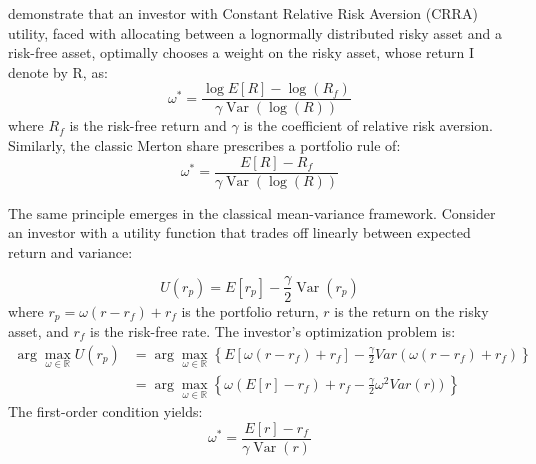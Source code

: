 \documentclass[12pt]{article}
\newcommand{\R}{\mathbb{R}}
\begin{document}
\citet{campbell2002strategic} demonstrate that an investor with Constant Relative Risk Aversion (CRRA) utility, faced with allocating between a lognormally distributed risky asset and a risk-free asset, optimally chooses a weight on the risky asset, whose return I denote by R, as:
\begin{equation}
\omega^* = \frac{\log E[R] - \log(R_f)}{\gamma \operatorname{Var}(\log(R))}
\end{equation}
where $R_f$ is the risk-free return and $\gamma$ is the coefficient of relative risk aversion. Similarly, the classic Merton share \citep{Merton} prescribes a portfolio rule of:
\begin{equation}
\omega^* = \frac{E[R] - R_f}{\gamma \operatorname{Var}(\log(R))}
\end{equation}

The same principle emerges in the classical mean-variance framework. Consider an investor with a utility function that trades off linearly between expected return and variance:

\begin{equation}
U(r_p) = E[r_p] - \frac{\gamma}{2}\operatorname{Var}(r_p)
\label{eq:mean_var}
\end{equation}
where $r_p = \omega(r-r_f) + r_f$ is the portfolio return, $r$ is the return on the risky asset, and $r_f$ is the risk-free rate. The investor's optimization problem is:
\begin{align*}
    \arg \max_{\omega \in \R} U(r_p) &= \arg \max_{\omega \in \R} \left\{ E\left[\omega (r - r_f) + r_f\right] - \frac{\gamma}{2}Var\left(\omega (r-r_f) + r_f\right)\right\} \\
    &= \arg \max_{\omega \in \R} \left\{ \omega (E[r] - r_f) + r_f  - \frac{\gamma}{2}\omega^2 Var\left(r)\right)\right\}
\end{align*}
The first-order condition yields:
\begin{equation}
\omega^* = \frac{E[r] - r_f}{\gamma \operatorname{Var}(r)}
\end{equation}
\end{document}
